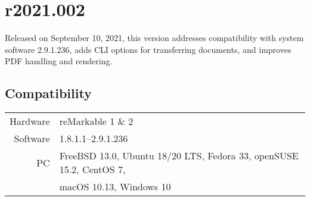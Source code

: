 \newpage
\section{r2021.002}
Released on September 10, 2021, this version addresses compatibility with system software 2.9.1.236, adds CLI options for transferring documents, and improves PDF handling and rendering.

\subsection{Compatibility}
\begin{tabular}{ r | l }
  Hardware & reMarkable 1 \& 2 \\
  Software & 1.8.1.1--2.9.1.236 \\
  PC & FreeBSD 13.0, Ubuntu 18/20 LTS, Fedora 33, openSUSE 15.2, CentOS 7, \\
  & macOS 10.13, Windows 10 \\
\end{tabular}


